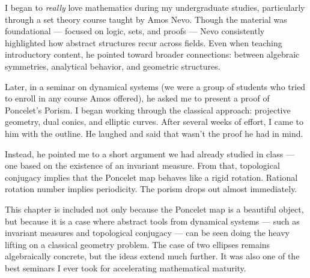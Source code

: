 \begin{commentary}
I began to \textit{really} love mathematics during my undergraduate studies, particularly through a set theory course taught by Amos Nevo. Though the material was foundational — focused on logic, sets, and proofs — Nevo consistently highlighted how abstract structures recur across fields. Even when teaching introductory content, he pointed toward broader connections: between algebraic symmetries, analytical behavior, and geometric structures.

Later, in a seminar on dynamical systems (we were a group of students who tried to enroll in any course Amos offered), he asked me to present a proof of Poncelet’s Porism. I began working through the classical approach: projective geometry, dual conics, and elliptic curves. After several weeks of effort, I came to him with the outline. He laughed and said that wasn’t the proof he had in mind.

Instead, he pointed me to a short argument we had already studied in class — one based on the existence of an invariant measure. From that, topological conjugacy implies that the Poncelet map behaves like a rigid rotation. Rational rotation number implies periodicity. The porism drops out almost immediately.


This chapter is included not only because the Poncelet map is a beautiful object, but because it is a case where abstract tools from dynamical systems — such as invariant measures and topological conjugacy — can be seen doing the heavy lifting on a classical geometry problem. The case of two ellipses remains algebraically concrete, but the ideas extend much further. It was also one of the best seminars I ever took for accelerating mathematical maturity.
\end{commentary}


